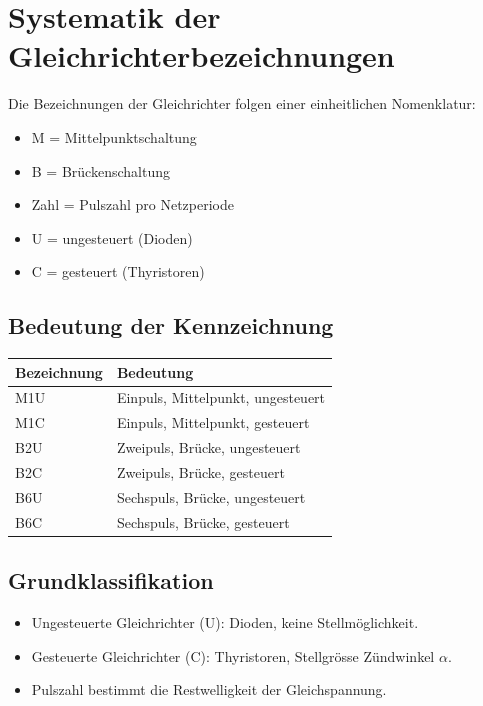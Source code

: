 \section{Systematik der Gleichrichterbezeichnungen}

Die Bezeichnungen der Gleichrichter folgen einer einheitlichen Nomenklatur:

\begin{itemize}
\item M = Mittelpunktschaltung
\item B = Brückenschaltung
\item Zahl = Pulszahl pro Netzperiode
\item U = ungesteuert (Dioden)
\item C = gesteuert (Thyristoren)
\end{itemize}

\subsection{Bedeutung der Kennzeichnung}

\begin{center}
\begin{tabular}{l|l}
Bezeichnung & Bedeutung \\ \hline
M1U & Einpuls, Mittelpunkt, ungesteuert \\
M1C & Einpuls, Mittelpunkt, gesteuert \\
B2U & Zweipuls, Brücke, ungesteuert \\
B2C & Zweipuls, Brücke, gesteuert \\
B6U & Sechspuls, Brücke, ungesteuert \\
B6C & Sechspuls, Brücke, gesteuert \\
\end{tabular}
\end{center}

\subsection{Grundklassifikation}

\begin{itemize}
\item Ungesteuerte Gleichrichter (U): Dioden, keine Stellmöglichkeit.
\item Gesteuerte Gleichrichter (C): Thyristoren, Stellgrösse Zündwinkel $\alpha$.
\item Pulszahl bestimmt die Restwelligkeit der Gleichspannung.
\end{itemize}

